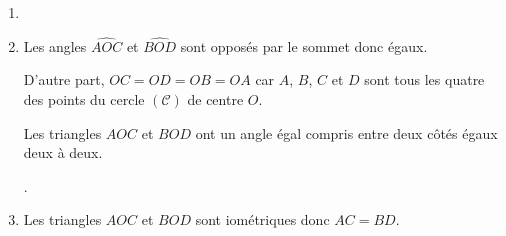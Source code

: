 \begin{corrige}
        \begin{enumerate}
            \item \phantom{rrr}
            

            \item Les angles $\widehat{AOC}$ et $\widehat{BOD}$ sont opposés par le sommet donc égaux.
            
            D'autre part, $OC=OD=OB=OA$ car $A$, $B$, $C$ et $D$ sont tous les quatre des points
            du cercle $(\mathcal{C})$ de centre $O$.

            Les triangles $AOC$ et $BOD$ ont un angle égal compris entre deux côtés égaux deux à deux.
            
            .
            \medskip
            \item Les triangles $AOC$ et $BOD$ sont iométriques donc $AC=BD$.
        \end{enumerate}
\end{corrige}

